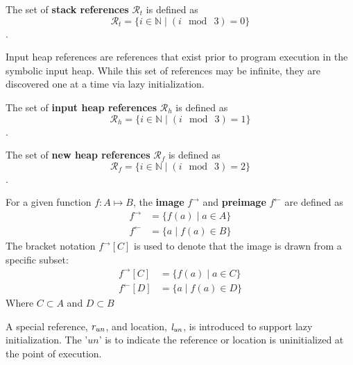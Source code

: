 \begin{definition}
The set of \textbf{stack references} $\mathcal{R}_t$ is defined as
 $$\mathcal{R}_t =\{i \in \mathbb{N} \mid ( i\ \bmod\ 3 ) = 0\}$$. 
\end{definition}

Input heap references are references that exist prior to program execution in the symbolic input heap. While this set of references may be infinite, they are discovered one at a time via lazy initialization.

\begin{definition}
The set of \textbf{input heap references} $\mathcal{R}_h$ is defined as
 $$\mathcal{R}_h =\{i \in \mathbb{N} \mid ( i\ \bmod\ 3 ) = 1\}$$. 
\end{definition}

\begin{definition}
The set of \textbf{new heap references} $\mathcal{R}_f$ is defined as
 $$\mathcal{R}_f =\{i \in \mathbb{N} \mid ( i\ \bmod\ 3 ) = 2\}$$. 
\end{definition}

\begin{definition}
For a given function $f:A \mapsto B$, the \textbf{image} $f^\rightarrow$ and \textbf{preimage} $f^\leftarrow$ are defined as
\begin{align}
 f^\rightarrow &= \{ f(a) \mid a \in A\}\\
 f^\leftarrow &= \{ a \mid f(a) \in B \}
 \end{align}
 The bracket notation $ f^\rightarrow [C] $ is used to denote that the image is drawn from a specific subset:
 \begin{align}
 f^\rightarrow [C] &= \{ f(a) \mid a \in C\}\\
 f^\leftarrow [D] &= \{ a \mid f(a) \in D \}
 \end{align}
 Where $C \subset A$ and $D \subset B$
\end{definition}

A special reference, $\emph{r}_\mathit{un}$, and location,
$\emph{l}_\mathit{un}$, is introduced to support lazy
initialization. The '$\mathit{un}$' is to indicate the reference or
location is uninitialized at the point of execution.

